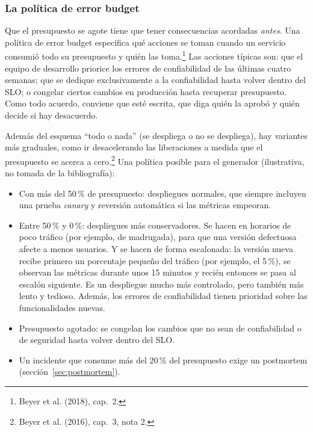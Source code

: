 \documentclass[variant=apuntes,cover=institutional,mode=screen]{ua-engineering-v6-article}
\begin{document}
\subsubsection{La política de error budget}

Que el presupuesto se agote tiene que tener consecuencias acordadas \emph{antes}. Una política de error budget especifica qué acciones se toman cuando un servicio consumió todo su presupuesto y quién las toma.\footnote{Beyer et al. (2018), cap.~2.} Las acciones típicas son: que el equipo de desarrollo priorice los errores de confiabilidad de las últimas cuatro semanas; que se dedique exclusivamente a la confiabilidad hasta volver dentro del SLO; o congelar ciertos cambios en producción hasta recuperar presupuesto. Como todo acuerdo, conviene que esté escrita, que diga quién la aprobó y quién decide si hay desacuerdo.

Además del esquema ``todo o nada'' (se despliega o no se despliega), hay variantes más graduales, como ir desacelerando las liberaciones a medida que el presupuesto se acerca a cero.\footnote{Beyer et al. (2016), cap.~3, nota 2.} Una política posible para el generador (ilustrativa, no tomada de la bibliografía):

\begin{uainfo}
\begin{itemize}
\item Con más del 50\,\% de presupuesto: despliegues normales, que siempre incluyen una prueba \emph{canary} y reversión automática si las métricas empeoran.
\item Entre 50\,\% y 0\,\%: despliegues más conservadores. Se hacen en horarios de poco tráfico (por ejemplo, de madrugada), para que una versión defectuosa afecte a menos usuarios. Y se hacen de forma escalonada: la versión nueva recibe primero un porcentaje pequeño del tráfico (por ejemplo, el 5\,\%), se observan las métricas durante unos 15 minutos y recién entonces se pasa al escalón siguiente. Es un despliegue mucho más controlado, pero también más lento y tedioso. Además, los errores de confiabilidad tienen prioridad sobre las funcionalidades nuevas.
\item Presupuesto agotado: se congelan los cambios que no sean de confiabilidad o de seguridad hasta volver dentro del SLO.
\item Un incidente que consume más del 20\,\% del presupuesto exige un postmortem (sección~\ref{sec:postmortem}).
\end{itemize}
\end{uainfo}
\end{document}
